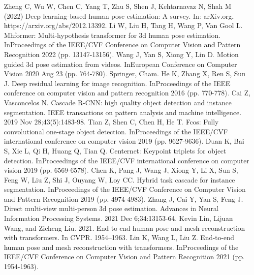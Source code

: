 \documentclass[runningheads]{llncs}
\begin{document}

\begin{thebibliography}{8}
   Zheng C, Wu W, Chen C, Yang T, Zhu S, Shen J, Kehtarnavaz N, Shah M (2022) Deep learning-based human pose estimation: A survey. In: arXiv.org. https://arxiv.org/abs/2012.13392.
   Li W, Liu H, Tang H, Wang P, Van Gool L. Mhformer: Multi-hypothesis transformer for 3d human pose estimation. InProceedings of the IEEE/CVF Conference on Computer Vision and Pattern Recognition 2022 (pp. 13147-13156).
   Wang J, Yan S, Xiong Y, Lin D. Motion guided 3d pose estimation from videos. InEuropean Conference on Computer Vision 2020 Aug 23 (pp. 764-780). Springer, Cham. %
   He K, Zhang X, Ren S, Sun J. Deep residual learning for image recognition. InProceedings of the IEEE conference on computer vision and pattern recognition 2016 (pp. 770-778).
   Cai Z, Vasconcelos N. Cascade R-CNN: high quality object detection and instance segmentation. IEEE transactions on pattern analysis and machine intelligence. 2019 Nov 28;43(5):1483-98.
   Tian Z, Shen C, Chen H, He T. Fcos: Fully convolutional one-stage object detection. InProceedings of the IEEE/CVF international conference on computer vision 2019 (pp. 9627-9636).
   Duan K, Bai S, Xie L, Qi H, Huang Q, Tian Q. Centernet: Keypoint triplets for object detection. InProceedings of the IEEE/CVF international conference on computer vision 2019 (pp. 6569-6578).
   Chen K, Pang J, Wang J, Xiong Y, Li X, Sun S, Feng W, Liu Z, Shi J, Ouyang W, Loy CC. Hybrid task cascade for instance segmentation. InProceedings of the IEEE/CVF Conference on Computer Vision and Pattern Recognition 2019 (pp. 4974-4983).
   Zhang J, Cai Y, Yan S, Feng J. Direct multi-view multi-person 3d pose estimation. Advances in Neural Information Processing Systems. 2021 Dec 6;34:13153-64.
   Kevin Lin, Lijuan Wang, and Zicheng Liu. 2021. End-to-end human pose and mesh reconstruction with transformers. In CVPR. 1954–1963.
   Lin K, Wang L, Liu Z. End-to-end human pose and mesh reconstruction with transformers. InProceedings of the IEEE/CVF Conference on Computer Vision and Pattern Recognition 2021 (pp. 1954-1963).

\end{thebibliography}
\end{document}
